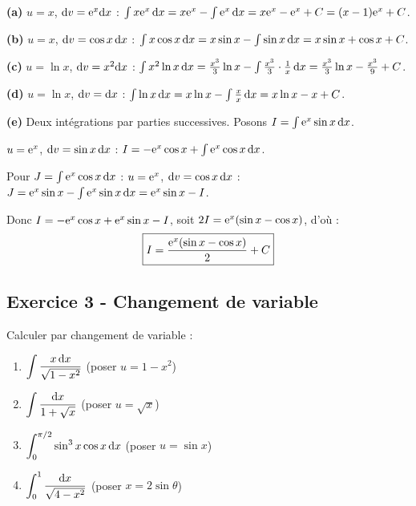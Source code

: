 \documentclass[12pt,a4paper]{article}
\begin{document}
\begin{boitecorrige}
\textbf{(a)} $u=x$, $\mathrm{d} v=\mathrm{e}^x\mathrm{d} x$ : $\int x\mathrm{e}^x\,\mathrm{d} x = x\mathrm{e}^x - \int\mathrm{e}^x\,\mathrm{d} x = x\mathrm{e}^x - \mathrm{e}^x + C = (x-1)\mathrm{e}^x+C$.

\textbf{(b)} $u=x$, $\mathrm{d} v=\cos x\,\mathrm{d} x$ : $\int x\cos x\,\mathrm{d} x = x\sin x - \int\sin x\,\mathrm{d} x = x\sin x+\cos x+C$.

\textbf{(c)} $u=\ln x$, $\mathrm{d} v=x^2\mathrm{d} x$ : $\int x^2\ln x\,\mathrm{d} x = \frac{x^3}{3}\ln x - \int\frac{x^3}{3}\cdot\frac{1}{x}\,\mathrm{d} x = \frac{x^3}{3}\ln x - \frac{x^3}{9}+C$.

\textbf{(d)} $u=\ln x$, $\mathrm{d} v=\mathrm{d} x$ : $\int\ln x\,\mathrm{d} x = x\ln x - \int\frac{x}{x}\,\mathrm{d} x = x\ln x - x+C$.

\textbf{(e)} Deux intégrations par parties successives. Posons $I=\int\mathrm{e}^x\sin x\,\mathrm{d} x$.

$u=\mathrm{e}^x$, $\mathrm{d} v=\sin x\,\mathrm{d} x$ : $I = -\mathrm{e}^x\cos x + \int\mathrm{e}^x\cos x\,\mathrm{d} x$.

Pour $J=\int\mathrm{e}^x\cos x\,\mathrm{d} x$ : $u=\mathrm{e}^x$, $\mathrm{d} v=\cos x\,\mathrm{d} x$ : $J=\mathrm{e}^x\sin x-\int\mathrm{e}^x\sin x\,\mathrm{d} x = \mathrm{e}^x\sin x-I$.

Donc $I = -\mathrm{e}^x\cos x + \mathrm{e}^x\sin x - I$, soit $2I = \mathrm{e}^x(\sin x-\cos x)$, d'où :
\[
\boxed{I = \frac{\mathrm{e}^x(\sin x - \cos x)}{2}+C}
\]
\end{boitecorrige}

\subsection*{Exercice 3 - Changement de variable \niveau{\moyen}}

\begin{boiteexercice}
Calculer par changement de variable :
\begin{enumerate}[label=(\alph*)]
  \item $\displaystyle\int\frac{x\,\mathrm{d} x}{\sqrt{1-x^2}}$ (poser $u=1-x^2$)
  \item $\displaystyle\int\frac{\mathrm{d} x}{1+\sqrt{x}}$ (poser $u=\sqrt{x}$)
  \item $\displaystyle\int_0^{\pi/2}\sin^3 x\cos x\,\mathrm{d} x$ (poser $u=\sin x$)
  \item $\displaystyle\int_0^1\frac{\mathrm{d} x}{\sqrt{4-x^2}}$ (poser $x=2\sin\theta$)
\end{enumerate}
\end{boiteexercice}
\end{document}
